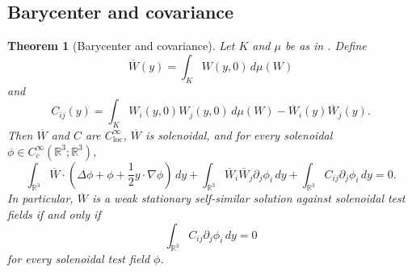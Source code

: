 \documentclass[11pt]{amsart}
\theoremstyle{plain}
\newtheorem{theorem}{Theorem}[section]
\theoremstyle{definition}
\theoremstyle{remark}
\numberwithin{equation}{section}
\newcommand{\R}{\mathbb R}
\newcommand{\loc}{\mathrm{loc}}
\begin{document}
\subsection{Barycenter and covariance}

\begin{theorem}[Barycenter and covariance]\label{thm:barycenter-covariance}
Let \(K\) and \(\mu\) be as in .  Define
\[
   \overline W(y)=\int_K W(y,0)\,d\mu(W)
\]
and
\[
   C_{ij}(y)
   =
   \int_K W_i(y,0)W_j(y,0)\,d\mu(W)
   -
   \overline W_i(y)\overline W_j(y).
\]
Then \(\overline W\) and \(C\) are \(C^\infty_{\loc}\), \(\overline W\) is
solenoidal, and for every solenoidal
\(\phi\in C_c^\infty(\R^3;\R^3)\),
\begin{equation}\label{eq:barycenter-covariance}
   \int_{\R^3}
   \overline W\cdot
   \left(\Delta\phi+\phi+\frac12 y\cdot\nabla\phi\right)\,dy
   +
   \int_{\R^3}
   \overline W_i\overline W_j\partial_j\phi_i\,dy
   +
   \int_{\R^3}C_{ij}\partial_j\phi_i\,dy
   =0 .
\end{equation}
In particular, \(\overline W\) is a weak stationary self-similar solution
against solenoidal test fields if and only if
\[
   \int_{\R^3}C_{ij}\partial_j\phi_i\,dy=0
\]
for every solenoidal test field \(\phi\).
\end{theorem}
\end{document}
